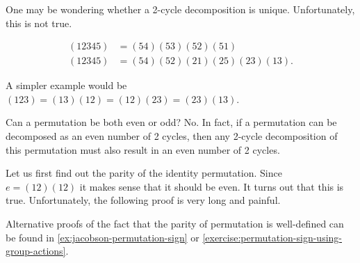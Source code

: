\documentclass[./main.tex]{subfiles}
\begin{document}
One may be wondering whether a 2-cycle decomposition is unique. Unfortunately,
this is not true.  

\begin{example}
    \begin{align*}
        (12345) &= (54)(53)(52)(51) \\
        (12345) &= (54)(52)(21)(25)(23)(13).
    \end{align*}

    A simpler example would be $(123) = (13)(12) = (12)(23) = (23)(13)$.
\end{example}

Can a permutation be both even or odd? No. In fact, if a permutation can be
decomposed as an even number of 2 cycles, then any 2-cycle decomposition of this
permutation must also result in an even number of 2 cycles. 

Let us first find out the parity of the identity permutation. Since $e =
(12)(12)$ it makes sense that it should be even. It turns out that this is true.
Unfortunately, the following proof is very long and painful. 

Alternative proofs of the fact that the parity of permutation is well-defined
can be found in \cref{ex:jacobson-permutation-sign} or
\cref{exercise:permutation-sign-using-group-actions}.
\end{document}
